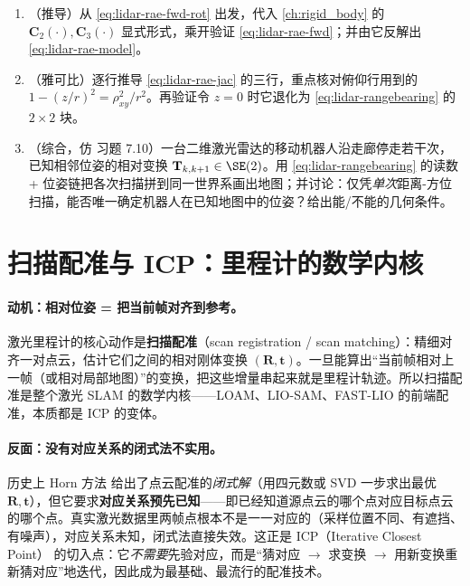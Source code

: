\begin{practice}
\begin{enumerate}
  \item （推导）从 \cref{eq:lidar-rae-fwd-rot} 出发，代入 \cref{ch:rigid_body} 的 $\mathbf C_2(\cdot),\mathbf C_3(\cdot)$ 显式形式，乘开验证 \cref{eq:lidar-rae-fwd}；并由它反解出 \cref{eq:lidar-rae-model}。
  \item （雅可比）逐行推导 \cref{eq:lidar-rae-jac} 的三行，重点核对俯仰行用到的 $1-(z/r)^2=\rho_{xy}^2/r^2$。再验证令 $z=0$ 时它退化为 \cref{eq:lidar-rangebearing} 的 $2\times2$ 块。
  \item （综合，仿 \cite{barfoot2024state} 习题 7.10）一台二维激光雷达的移动机器人沿走廊停走若干次，已知相邻位姿的相对变换 $\mathbf T_{k,k+1}\in\SE(2)$。用 \cref{eq:lidar-rangebearing} 的读数 + 位姿链把各次扫描拼到同一世界系画出地图；并讨论：仅凭\emph{单次}距离-方位扫描，能否唯一确定机器人在已知地图中的位姿？给出能/不能的几何条件。
\end{enumerate}
\end{practice}

\section{扫描配准与 ICP：里程计的数学内核}
\label{sec:lidar-scan-reg}

\paragraph{动机：相对位姿 = 把当前帧对齐到参考。}
激光里程计的核心动作是\textbf{扫描配准}（scan registration / scan matching）：精细对齐一对点云，估计它们之间的相对刚体变换 $(\mathbf{R},\mathbf{t})$。一旦能算出“当前帧相对上一帧（或相对局部地图）”的变换，把这些增量串起来就是里程计轨迹。所以扫描配准是整个激光 SLAM 的数学内核——LOAM、LIO-SAM、FAST-LIO 的前端配准，本质都是 ICP 的变体。

\paragraph{反面：没有对应关系的闭式法不实用。}
历史上 Horn 方法\cite{horn1987closed} 给出了点云配准的\emph{闭式解}（用四元数或 SVD 一步求出最优 $\mathbf{R},\mathbf{t}$），但它要求\textbf{对应关系预先已知}——即已经知道源点云的哪个点对应目标点云的哪个点。真实激光数据里两帧点根本不是一一对应的（采样位置不同、有遮挡、有噪声），对应关系未知，闭式法直接失效。这正是 ICP（Iterative Closest Point）\cite{besl1992icp} 的切入点：它\emph{不需要}先验对应，而是“猜对应 $\to$ 求变换 $\to$ 用新变换重新猜对应”地迭代，因此成为最基础、最流行的配准技术。

